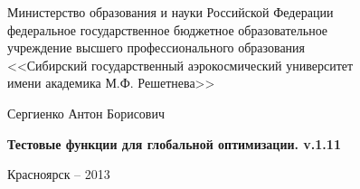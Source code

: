 \thispagestyle{empty}

\begin{center}
Министерство образования и науки Российской Федерации \\ федеральное государственное бюджетное образовательное \\ учреждение высшего профессионального образования \\<<Сибирский государственный аэрокосмический университет \\ имени академика М.Ф. Решетнева>>
\end{center}

\vspace{20mm}


\vspace{30mm}
\begin{center}
{\large Сергиенко Антон Борисович}
\end{center}

\vspace{5mm}
\begin{center}
{\bf \large Тестовые функции для глобальной оптимизации. v.1.11
\par}

\vspace{10mm}


\vspace{10mm}

\end{center}

\vspace{80mm}


\vspace{20mm}
\begin{center}
{Красноярск -- 2013}
\end{center}

\newpage